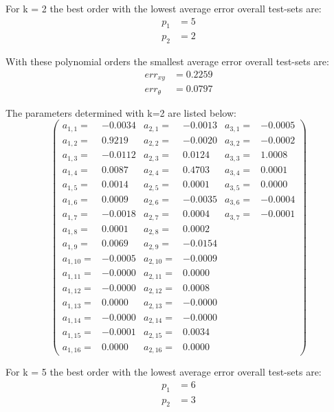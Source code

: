 \documentclass[conference]{IEEEtran}
\begin{document}
\begin{compactenum}[a)]

\item For k = 2 the best order with the lowest average error overall test-sets are:
\begin{align}
	p_1 & = 5\\
	p_2 & = 2
\end{align}

With these polynomial orders the smallest average error overall test-sets are:
\begin{align}
	err_{xy} & = 0.2259\\
	err_{\theta} & = 0.0797
\end{align}

The parameters determined with k=2 are listed below:
$$
\left(
\scriptscriptstyle{
\begin{smallmatrix}
a_{1,1} =& -0.0034 	& a_{2,1} =& -0.0013 & a_{3,1} =& -0.0005\\
a_{1,2} =&  0.9219  & a_{2,2} =& -0.0020 & a_{3,2} =& -0.0002\\
a_{1,3} =& -0.0112 	& a_{2,3} =&  0.0124 & a_{3,3} =&  1.0008\\
a_{1,4} =&  0.0087  & a_{2,4} =&  0.4703 & a_{3,4} =&  0.0001\\
a_{1,5} =&  0.0014  & a_{2,5} =&  0.0001 & a_{3,5} =&  0.0000\\
a_{1,6} =&  0.0009  & a_{2,6} =& -0.0035 & a_{3,6} =& -0.0004\\
a_{1,7} =& -0.0018 	& a_{2,7} =&  0.0004 & a_{3,7} =& -0.0001\\
a_{1,8} =&  0.0001  & a_{2,8} =&  0.0002	\\
a_{1,9} =&  0.0069  & a_{2,9} =& -0.0154	\\
a_{1,10} =&-0.0005 	& a_{2,10} =&-0.0009	\\
a_{1,11} =&-0.0000 	& a_{2,11} =& 0.0000	\\
a_{1,12} =&-0.0000 	& a_{2,12} =& 0.0008	\\
a_{1,13} =& 0.0000  & a_{2,13} =&-0.0000	\\
a_{1,14} =&-0.0000 	& a_{2,14} =&-0.0000	\\
a_{1,15} =&-0.0001 	& a_{2,15} =& 0.0034	\\
a_{1,16} =& 0.0000  & a_{2,16} =& 0.0000	
\end{smallmatrix}}
\right)
$$

\item For k = 5 the best order with the lowest average error overall test-sets are:
\begin{align}
	p_1 & = 6\\
	p_2 & = 3
\end{align}


\end{compactenum}
\end{document}
